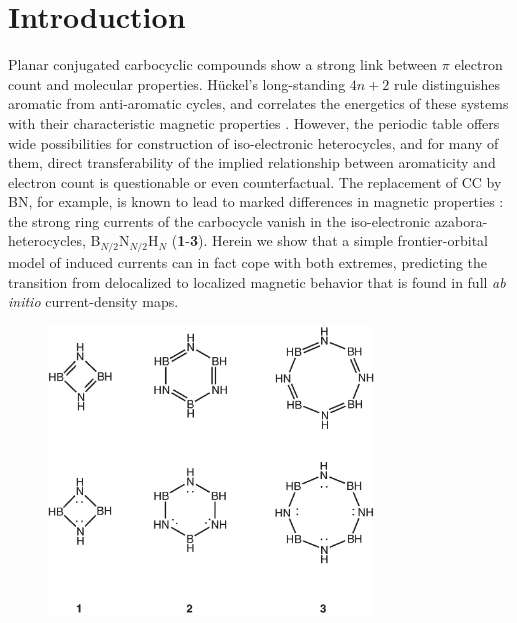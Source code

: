 \section{Introduction}
Planar conjugated carbocyclic compounds show a strong link between $\pi$ electron count and molecular properties. H\"uckel's long-standing $4n+2$ rule distinguishes aromatic from anti-aromatic cycles, and correlates the energetics of these systems with their characteristic magnetic properties \cite{r01}. However, the periodic table offers wide possibilities for construction of iso-electronic heterocycles, and for many of them, direct transferability of the implied relationship between aromaticity and electron count is questionable or even counterfactual.  The replacement of CC by BN, for example, is known to lead to marked differences in magnetic properties \cite{r02}: the strong ring currents of the carbocycle vanish in the iso-electronic azabora-heterocycles, B$_{N/2}$N$_{N/2}$H$_N$ (\textbf{1}-\textbf{3}).  Herein we show that a simple frontier-orbital model of induced currents can in fact cope with both extremes, predicting the transition from delocalized to localized magnetic behavior that is found in full \textit{ab initio} current-density maps.
\begin{figure} [htdp]
\begin{center}
\includegraphics[width=3.4in]{huckel/figures/scheme1.eps}
\end{center}
\end{figure}

